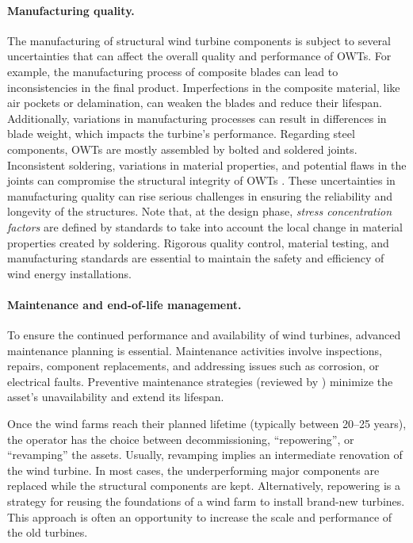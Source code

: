 \paragraph{Manufacturing quality.}
The manufacturing of structural wind turbine components is subject to several uncertainties that can affect the overall quality and performance of OWTs. 
For example, the manufacturing process of composite blades can lead to inconsistencies in the final product. 
Imperfections in the composite material, like air pockets or delamination, can weaken the blades and reduce their lifespan. 
Additionally, variations in manufacturing processes can result in differences in blade weight, which impacts the turbine's performance. 
Regarding steel components, OWTs are mostly assembled by bolted and soldered joints. 
Inconsistent soldering, variations in material properties, and potential flaws in the joints can compromise the structural integrity of OWTs \citep{veers_2019_review}. 
These uncertainties in manufacturing quality can rise serious challenges in ensuring the reliability and longevity of the structures. 
Note that, at the design phase, \textit{stress concentration factors} are defined by standards to take into account the local change in material properties created by soldering. 
Rigorous quality control, material testing, and manufacturing standards are essential to maintain the safety and efficiency of wind energy installations. 


\paragraph{Maintenance and end-of-life management.}
To ensure the continued performance and availability of wind turbines, advanced maintenance planning is essential. 
Maintenance activities involve inspections, repairs, component replacements, and addressing issues such as corrosion, or electrical faults. 
Preventive maintenance strategies (reviewed by \citet{ren_2021_owt_maintenance}) minimize the asset's unavailability and extend its lifespan. 

Once the wind farms reach their planned lifetime (typically between 20--25 years), the operator has the choice between decommissioning, ``repowering'', or ``revamping'' the assets. 
Usually, revamping implies an intermediate renovation of the wind turbine. 
In most cases, the underperforming major components are replaced while the structural components are kept. 
Alternatively, repowering is a strategy for reusing the foundations of a wind farm to install brand-new turbines. 
This approach is often an opportunity to increase the scale and performance of the old turbines. 

